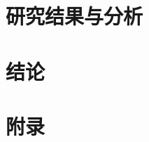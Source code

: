 \documentclass[lang=cn,18pt,a4paper]{elegantpaper}
\begin{document}
    \section{研究结果与分析}\label{sec:results}
	
	\newpage
	\section{结论} \label{sec:conclusion}
	
	\newpage
%	
%	
	\nocite{*}
	\printbibliography[heading=bibintoc, title=\ebibname]
	\newpage
	\appendix
	\section{附录} \label{sec:appendix}
	
	\addappheadtotoc
\end{document}
